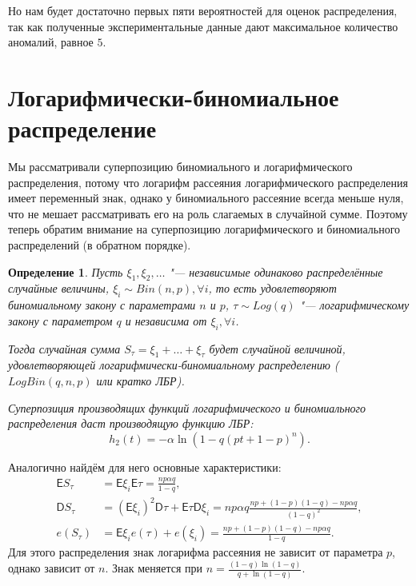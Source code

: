 \documentclass[12pt, specialist, subf, substylefile = spbu_report.rtx]{disser}
\newtheorem{define}{Определение}
\begin{document}
	Но нам будет достаточно первых пяти вероятностей для оценок распределения, так как полученные экспериментальные данные дают максимальное количество аномалий, равное $ 5 $.
	
	\section{Логарифмически-биномиальное распределение}
	
	\label{LBR}
	
	Мы рассматривали суперпозицию биномиального и логарифмического распределения, потому что логарифм рассеяния логарифмического распределения имеет переменный знак, однако у биномиального рассеяние всегда меньше нуля, что не мешает рассматривать его на роль слагаемых в случайной сумме. Поэтому теперь обратим внимание на суперпозицию логарифмического и биномиального распределений (в обратном порядке).
	
	\begin{define}
		Пусть $\xi _1, \xi _2, \dots$ "--- независимые одинаково распределённые случайные величины, $\xi _i \sim Bin(n, p), \forall i$, то есть удовлетворяют биномиальному закону с параметрами $n$ и $p$, $\tau \sim Log(q)$ "--- логарифмическому закону с параметром $q$ и независима от $\xi _i, \forall i$.
		
		Тогда случайная сумма $S _\tau = \xi _1 + \dots + \xi _\tau$ будет случайной величиной, удовлетворяющей логарифмически-биномиальному распределению ($LogBin(q, n, p)$ или кратко \glqq ЛБР\grqq).
		
		Суперпозиция производящих функций логарифмического и биномиального  распределения даст производящую функцию ЛБР:
		\begin{equation}\label{eq:LBR}
			h _2(t) = - \alpha \ln (1 - q (p t + 1 - p) ^n).
		\end{equation}
		\label{def:LBR}
	\end{define}
	
	Аналогично найдём для него основные характеристики:
	\[
		\begin{aligned}
		 	\mathsf{E} S _\tau &= \mathsf{E} \xi _i \mathsf{E} \tau = \frac {n p \alpha q} {1 - q},\\
		 	\mathsf{D} S _\tau &= \left( \mathsf{E} \xi _i \right) ^2 \mathsf{D} \tau + \mathsf{E} \tau \mathsf{D} \xi _i = n p \alpha q \frac {np + (1 - p) (1 - q) - n p \alpha q} {(1 - q) ^2},\\
		 	e (S _\tau) &= \mathsf{E} \xi _i e (\tau) + e (\xi _i) = \frac {np + (1 - p) (1 - q) - n p \alpha q} {1 - q}.
		\end{aligned}
	\]
	Для этого распределения знак логарифма рассеяния не зависит от параметра $ p $, однако зависит от $ n $. Знак меняется при $ n = \frac{(1 - q) \ln(1 - q)}{q + \ln(1 - q)} $.
	
\end{document}
